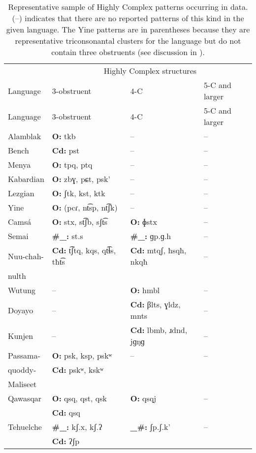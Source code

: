 {\footnotesize\begin{longtable}{llll}
\caption{\label{tab:3.12}Representative sample of Highly Complex patterns occurring in data. (--) indicates that there are no reported patterns of this kind in the given language. The Yine patterns are in parentheses because they are representative triconsonantal clusters for the language but do not contain three obstruents (see discussion in ).}\\
\lsptoprule  & \multicolumn{3}{c}{Highly Complex structures}\\\cmidrule(lr){2-4} {Language} & 3-obstruent & 4-C & 5-C and larger\\\midrule\endfirsthead\midrule Language & 3-obstruent & 4-C & 5-C and larger\\\midrule\endhead
\lspbottomrule\endlastfoot\endfoot
{Alamblak} & \textbf{O:} tkb & -- & --\\
{Bench} & \textbf{Cd:} pst & -- & --\\
{Menya} & \textbf{O:} tpq, ptq & -- & --\\
{Kabardian} & \textbf{O:} zbɣ, pɕt, psk’ & -- & --\\
{Lezgian} & \textbf{O:} ʃtk, kst, ktk & -- & --\\
{Yine} & \textbf{O:} (pcɾ, nt͡sp, nt͡ʃk) & -- & --\\
{Camsá} & \textbf{O:} stx, st͡ʃb, sʃt͡s & {\textbf{O:} ɸstx} & -- \\
{Semai} & \textbf{\#\_:} st.s & \textbf{\#\_:} ɡp.ɡ.h & --\\
{Nuu-chah-} & \textbf{Cd:} t͡ʃtq, kqs, qt͡ɬs, tħt͡s & \textbf{Cd:} mtqʃ, ħsqħ, nkqħ & --\\
nulth \\\tablevspace
{Wutung} & -- & \textbf{O:} hmbl & --\\
{Doyayo} & -- & \textbf{Cd:} βlts, ɣldz, mnts & --\\
{Kunjen} & -- & \textbf{Cd:} lbmb, ɹdnd, jɡŋɡ & --\\
{Passama-} & \textbf{O:} psk, ksp, pskʷ & -- & --\\
quoddy-  &  \textbf{Cd:} pskʷ, kskʷ  \\
Maliseet \\\tablevspace
{Qawasqar} & \textbf{O:} qsq, qst, qsk & \textbf{O:} qsqj & --\\
           & \textbf{Cd:} qsq  \\
{Tehuelche} & \textbf{\#\_:} kʃ.x, kʃ.ʔ  & \textbf{\_\#:} ʃp.ʃ.k’ & --\\
            & \textbf{Cd:} ʔʃp\\

\end{longtable}}
